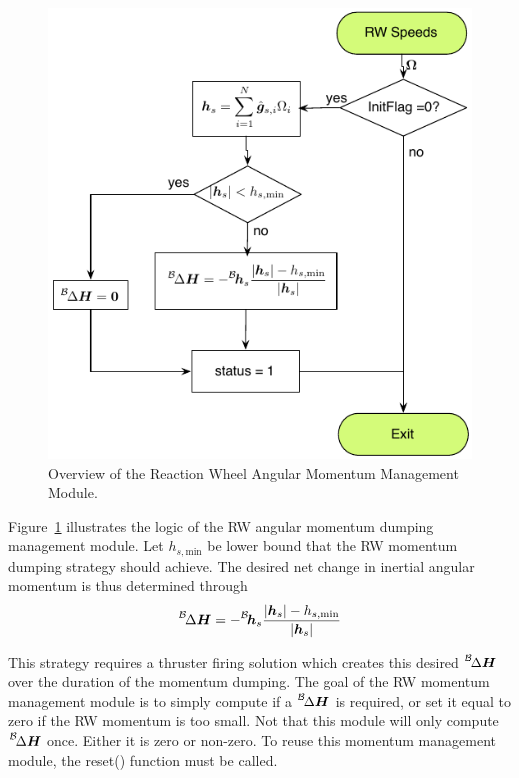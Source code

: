 \documentclass[]{BasiliskReportMemo}
\begin{document}
\begin{figure}[tp]
	\centerline{
	\includegraphics[]{Figures/rwMomentumManagement}
	}
	\caption{Overview of the Reaction Wheel Angular Momentum Management Module.}
	\label{fig:Fig2}
\end{figure}

Figure~\ref{fig:Fig2} illustrates the logic of the RW angular momentum dumping management module.  Let $h_{s,\text{min}}$ be lower bound that the RW momentum dumping strategy should achieve.  The desired net change in inertial angular momentum is thus determined through
\begin{equation}
	\leftexp{B}{\Delta}\bm H = -\leftexp{B}{\bm h}_{s} \frac{
		|\bm h_{s}| - h_{s,\text{min}}
	}{|\bm h_{s}|} 
\end{equation}

This strategy requires a thruster firing solution which creates this desired $\leftexp{B}{\Delta}\bm H$ over the duration of the momentum dumping.  The goal of the RW momentum management module is to simply compute if a $\leftexp{B}{\Delta}\bm H$ is required, or set it equal to zero if the RW momentum is too small.  Not that this module will only compute $\leftexp{B}{\Delta}\bm H$ once.  Either it is zero or non-zero.  To reuse this momentum management module, the reset() function must be called.
\end{document}
